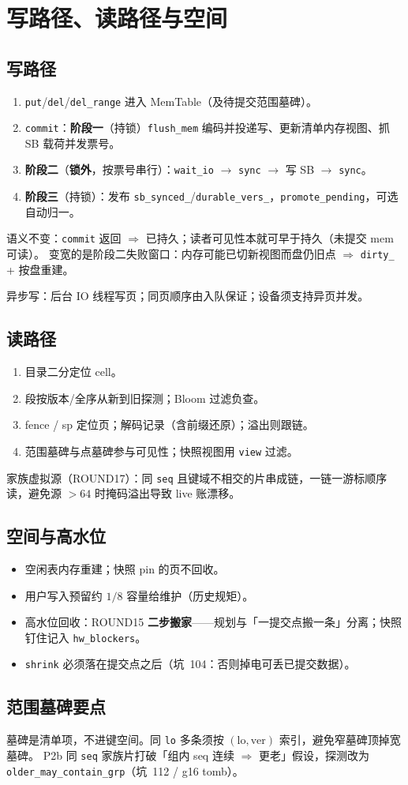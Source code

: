 \section{写路径、读路径与空间}

\subsection{写路径}
\begin{enumerate}[leftmargin=1.8em]
  \item \texttt{put}/\texttt{del}/\texttt{del\_range} 进入 MemTable（及待提交范围墓碑）。
  \item \texttt{commit}：\textbf{阶段一}（持锁）\texttt{flush\_mem} 编码并投递写、更新清单内存视图、抓 SB 载荷并发票号。
  \item \textbf{阶段二}（\textbf{锁外}，按票号串行）：\texttt{wait\_io} $\to$ \texttt{sync} $\to$ 写 SB $\to$ \texttt{sync}。
  \item \textbf{阶段三}（持锁）：发布 \texttt{sb\_synced\_}/\texttt{durable\_vers\_}，\texttt{promote\_pending}，可选自动归一。
\end{enumerate}
语义不变：\texttt{commit} 返回 $\Rightarrow$ 已持久；读者可见性本就可早于持久（未提交 mem 可读）。
变宽的是阶段二失败窗口：内存可能已切新视图而盘仍旧点 $\Rightarrow$ \texttt{dirty\_} + 按盘重建。

异步写：后台 IO 线程写页；同页顺序由入队保证；设备须支持异页并发。

\subsection{读路径}
\begin{enumerate}[leftmargin=1.8em]
  \item 目录二分定位 cell。
  \item 段按版本/全序从新到旧探测；Bloom 过滤负查。
  \item fence / sp 定位页；解码记录（含前缀还原）；溢出则跟链。
  \item 范围墓碑与点墓碑参与可见性；快照视图用 \texttt{view} 过滤。
\end{enumerate}
家族虚拟源（ROUND17）：同 \texttt{seq} 且键域不相交的片串成链，一链一游标顺序读，避免源 $>64$ 时掩码溢出导致 live 账漂移。

\subsection{空间与高水位}
\begin{itemize}[leftmargin=1.6em]
  \item 空闲表内存重建；快照 pin 的页不回收。
  \item 用户写入预留约 $1/8$ 容量给维护（历史规矩）。
  \item 高水位回收：ROUND15 \textbf{二步搬家}——规划与「一提交点搬一条」分离；快照钉住记入 \texttt{hw\_blockers}。
  \item \texttt{shrink} 必须落在提交点之后（坑~104：否则掉电可丢已提交数据）。
\end{itemize}

\subsection{范围墓碑要点}
墓碑是清单项，不进键空间。同 \texttt{lo} 多条须按 $(\mathrm{lo},\mathrm{ver})$ 索引，避免窄墓碑顶掉宽墓碑。
P2b 同 \texttt{seq} 家族片打破「组内 seq 连续 $\Rightarrow$ 更老」假设，探测改为 \texttt{older\_may\_contain\_grp}（坑~112 / g16 tomb）。
